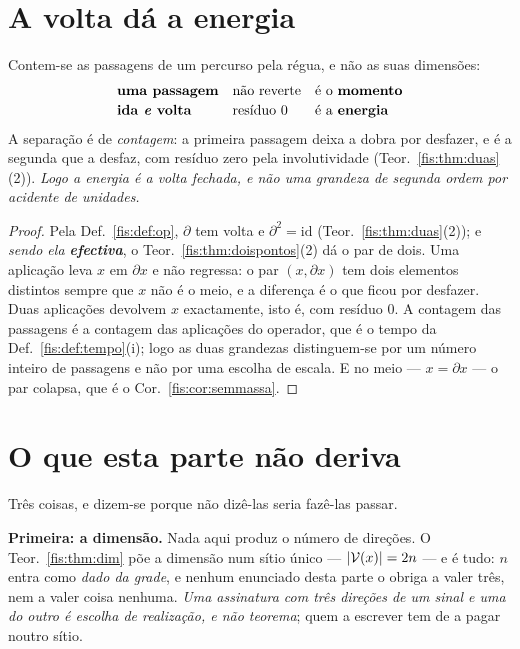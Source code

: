 \documentclass[livro.tex]{subfiles}
\begin{document}
\section{A volta dá a energia}\label{fis:rel-volta}

\begin{teorema}\label{fis:thm:volta}
Contem-se as passagens de um percurso pela régua, e não as suas dimensões:
\[
\begin{array}{lll}
\textbf{uma passagem} & \text{não reverte} & \text{é o \textbf{momento}}\\[2pt]
\textbf{ida \emph{e} volta} & \text{resíduo }0 & \text{é a \textbf{energia}}
\end{array}
\]
A separação é de \emph{contagem}: a primeira passagem deixa a dobra por desfazer,
e é a segunda que a desfaz, com resíduo zero pela involutividade
(Teor.~\ref{fis:thm:duas}(2)). \emph{Logo a energia é a volta fechada, e não uma
grandeza de segunda ordem por acidente de unidades.}
\end{teorema}

\begin{proof}
Pela Def.~\ref{fis:def:op}, $\partial$ tem volta e $\partial^{2}=\mathrm{id}$
(Teor.~\ref{fis:thm:duas}(2)); e \emph{sendo ela \textbf{efectiva}}, o
Teor.~\ref{fis:thm:doispontos}(2) dá o par de dois. Uma aplicação leva $x$ em $\partial x$ e não
regressa: o par $(x,\partial x)$ tem dois elementos distintos sempre que $x$ não
é o meio, e a diferença é o que ficou por desfazer. Duas aplicações devolvem $x$
exactamente, isto é, com resíduo $0$. A contagem das passagens é a contagem das
aplicações do operador, que é o tempo da Def.~\ref{fis:def:tempo}(i); logo as duas
grandezas distinguem-se por um número inteiro de passagens e não por uma escolha
de escala. E no meio --- $x=\partial x$ --- o par colapsa, que é o
Cor.~\ref{fis:cor:semmassa}.
\end{proof}

\section{O que esta parte não deriva}\label{fis:rel-naoderiva}

\noindent Três coisas, e dizem-se porque não dizê-las seria fazê-las passar.

\medskip\noindent\textbf{Primeira: a dimensão.} Nada aqui produz o número de
direções. O Teor.~\ref{fis:thm:dim} põe a dimensão num sítio único ---
$\lvert \mathcal{V}(x)\rvert=2n$ --- e é tudo: $n$ entra como \emph{dado da grade}, e
nenhum enunciado desta parte o obriga a valer três, nem a valer coisa nenhuma.
\emph{Uma assinatura com três direções de um sinal e uma do outro é escolha de
realização, e não teorema}; quem a escrever tem de a pagar noutro sítio.
\end{document}

